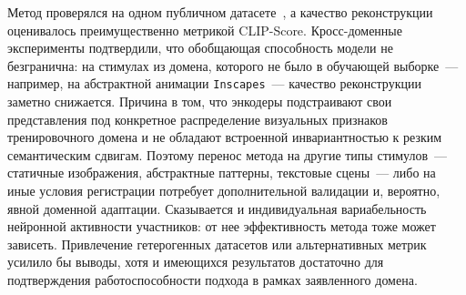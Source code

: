 Метод проверялся на одном публичном датасете~\cite{Telesford2023}, а качество реконструкции оценивалось преимущественно метрикой CLIP-Score. Кросс-доменные эксперименты подтвердили, что обобщающая способность модели не безгранична: на стимулах из домена, которого не было в обучающей выборке~--- например, на абстрактной анимации \texttt{Inscapes}~--- качество реконструкции заметно снижается. Причина в том, что энкодеры подстраивают свои представления под конкретное распределение визуальных признаков тренировочного домена и не обладают встроенной инвариантностью к резким семантическим сдвигам. Поэтому перенос метода на другие типы стимулов~--- статичные изображения, абстрактные паттерны, текстовые сцены~--- либо на иные условия регистрации потребует дополнительной валидации и, вероятно, явной доменной адаптации. Сказывается и индивидуальная вариабельность нейронной активности участников: от нее эффективность метода тоже может зависеть. Привлечение гетерогенных датасетов или альтернативных метрик усилило бы выводы, хотя и имеющихся результатов достаточно для подтверждения работоспособности подхода в рамках заявленного домена.
